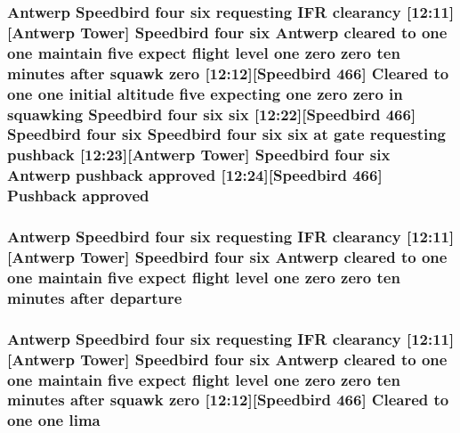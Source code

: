 \subsubsection[{\texorpdfstring{approved}{approved}}]{\setlength{\rightskip}{0pt plus 5cm}Antwerp Speedbird four {\bf six} requesting I\+FR clearancy \mbox{[}12\+:11\mbox{]}\mbox{[}Antwerp {\bf Tower}\mbox{]} Speedbird four {\bf six} Antwerp cleared to {\bf one} {\bf one} maintain five expect flight level {\bf one} {\bf zero} {\bf zero} {\bf ten} minutes after squawk {\bf zero} \mbox{[}12\+:12\mbox{]}\mbox{[}Speedbird 466\mbox{]} Cleared to {\bf one} {\bf one} initial altitude five expecting {\bf one} {\bf zero} {\bf zero} in {\bf squawking} Speedbird four {\bf six} {\bf six} \mbox{[}12\+:22\mbox{]}\mbox{[}Speedbird 466\mbox{]} Speedbird four {\bf six} Speedbird four {\bf six} {\bf six} at gate requesting pushback \mbox{[}12\+:23\mbox{]}\mbox{[}Antwerp {\bf Tower}\mbox{]} Speedbird four {\bf six} Antwerp pushback approved \mbox{[}12\+:24\mbox{]}\mbox{[}Speedbird 466\mbox{]} Pushback approved}\hypertarget{happyDay5ExpectedATC_8txt_ac858d170c8c9788ee90f1502f4299d18}{}\label{happyDay5ExpectedATC_8txt_ac858d170c8c9788ee90f1502f4299d18}
\subsubsection[{\texorpdfstring{departure}{departure}}]{\setlength{\rightskip}{0pt plus 5cm}Antwerp Speedbird four {\bf six} requesting I\+FR clearancy \mbox{[}12\+:11\mbox{]}\mbox{[}Antwerp {\bf Tower}\mbox{]} Speedbird four {\bf six} Antwerp cleared to {\bf one} {\bf one} maintain five expect flight level {\bf one} {\bf zero} {\bf zero} {\bf ten} minutes after departure}\hypertarget{happyDay5ExpectedATC_8txt_af9835824e50bb6ca59bed75129f137e3}{}\label{happyDay5ExpectedATC_8txt_af9835824e50bb6ca59bed75129f137e3}
\subsubsection[{\texorpdfstring{lima}{lima}}]{\setlength{\rightskip}{0pt plus 5cm}Antwerp Speedbird four {\bf six} requesting I\+FR clearancy \mbox{[}12\+:11\mbox{]}\mbox{[}Antwerp {\bf Tower}\mbox{]} Speedbird four {\bf six} Antwerp cleared to {\bf one} {\bf one} maintain five expect flight level {\bf one} {\bf zero} {\bf zero} {\bf ten} minutes after squawk {\bf zero} \mbox{[}12\+:12\mbox{]}\mbox{[}Speedbird 466\mbox{]} Cleared to {\bf one} {\bf one} lima}\hypertarget{happyDay5ExpectedATC_8txt_abc10fad7597c191bcd8586b1cddb7835}{}\label{happyDay5ExpectedATC_8txt_abc10fad7597c191bcd8586b1cddb7835}
